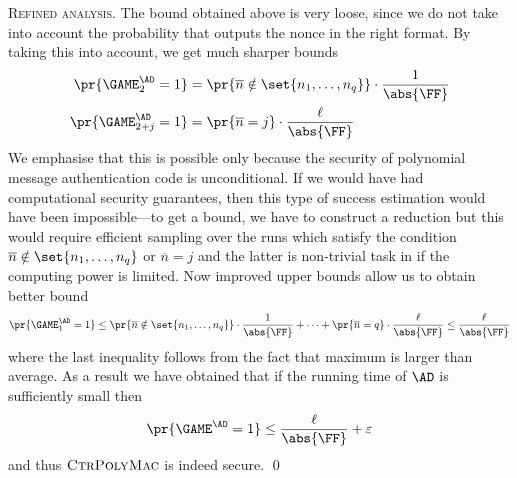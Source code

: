 \documentclass{crypto-exercise}
\newcommand{\CTRMAC}{\textsc{CtrPolyMac}}
\begin{document}
\begin{solution}
\vspace*{2ex}
\noindent
\textsc{Refined analysis.}
The bound obtained above is very loose, since we do not take into account the probability that outputs the nonce in the right format. By taking this into account, we get much sharper bounds
\begin{align*}
  \pr{\GAME_2^\AD=1}&=\pr{\overline{n}\notin\set{n_1,\ldots, n_q}}\cdot\frac{1}{\abs{\FF}}\\ 
  \pr{\GAME_{2+j}^\AD=1}&=\pr{\overline{n}=j}\cdot\frac{\ell}{\abs{\FF}}
\end{align*}
We emphasise that this is possible only because the security of
polynomial message authentication code is unconditional. If we would
have had computational security guarantees, then this type of success
estimation would have been impossible---to get a bound, we have to construct a reduction but this would require efficient sampling over the runs which satisfy the condition $\overline{n}\notin\set{n_1,\ldots, n_q}$ or $\overline{n}=j$ and the latter is non-trivial task in if the computing power is limited.  Now improved upper bounds allow us to obtain better bound
\begin{align*}
  \pr{\GAME_1^\AD=1}\leq \pr{\overline{n}\notin\set{n_1,\ldots,
      n_q}}\cdot\frac{1}{\abs{\FF}}+\cdots+\pr{\overline{n}=q}\cdot\frac{\ell}{\abs{\FF}}\leq
  \frac{\ell}{\abs{\FF}}
\end{align*}
where the last inequality follows from the fact that maximum is larger
than average.  As a result we have obtained that if the running time
of $\AD$ is sufficiently small then
\begin{align*}
  \pr{\GAME^\AD=1}\leq  \frac{\ell}{\abs{\FF}}+\varepsilon
\end{align*}
and thus $\CTRMAC$ is indeed secure. \qed
\end{solution}
\end{document}
